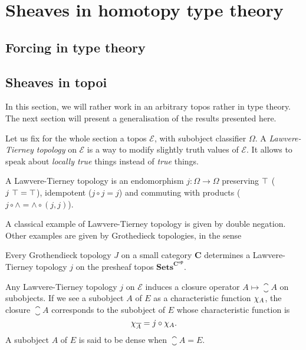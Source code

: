 \chapter{Sheaves in homotopy type theory}
\label{chap:sheaf}

\section{Forcing in type theory}
\label{sec:forcing}

\section{Sheaves in topoi}
\label{sec:sheaf_topos}

In this section, we will rather work in an arbitrary topos rather in type theory. The next section will present a
generalisation of the results presented here.

Let us fix for the whole section a topos $\mathcal E$, with subobject
classifier $\Omega$. A {\em Lawvere-Tierney topology} on $\mathcal E$
is a way to modify slightly truth values of $\mathcal E$. It allows to
speak about {\em locally true} things instead of {\em true} things.

\begin{defi}\label{defi:LT}
  A Lawvere-Tierney topology is an endomorphism $j:\Omega \to \Omega$
  preserving $\top$ ($j \ \top = \top$), idempotent ($j\circ j =
  j$) and commuting with products ($j \circ \wedge = \wedge \circ (j,j)$).
\end{defi}

A classical example of Lawvere-Tierney topology is given by double
negation. Other examples are given by Grothedieck topologies, in the
sense
\begin{thm}
  Every Grothendieck topology $J$ on a small category $\mathbf C$ determines a
  Lawvere-Tierney topology $j$ on the presheaf topos
  $\mathbf{Sets}^{\mathbf C^{\mathbf{op}}}$.
\end{thm}

Any Lawvere-Tierney topology $j$ on $\mathcal E$ induces a closure operator
$A \mapsto \closure{A}$ on subobjects. If we see a subobject $A$ of $E$
as a characteristic function $\chi_{A}$, the closure $\closure{A}$
corresponds to the subobject of $E$ whose characteristic function is 
%
\[
\chi_{\overline{A}} = j \circ \chi_{A}.
\]%
%
A subobject $A$ of $E$ is said to
be dense when $\closure{A} = E$.

